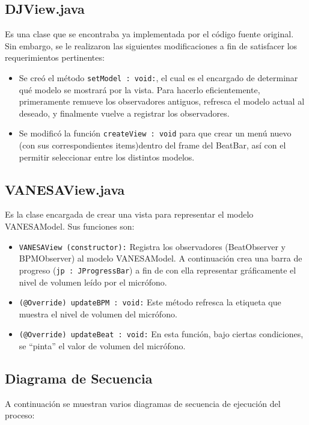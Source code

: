 \documentclass[10pt]{article} %
\newcommand{\comillas}[1]{``#1''}
\begin{document}
\subsection{DJView.java}
Es una clase que se encontraba ya implementada por el código fuente original. Sin embargo, se le realizaron las siguientes modificaciones a fin de satisfacer los requerimientos pertinentes:
\begin{itemize}
\item Se creó el método \verb+setModel : void:+, el cual es el encargado de determinar qué modelo se mostrará por la vista. Para hacerlo eficientemente, primeramente remueve los observadores antiguos, refresca el modelo actual al deseado, y finalmente vuelve a registrar los observadores.
\item Se modificó la función \verb+createView : void+ para que crear un menú nuevo (con sus correspondientes items)dentro del frame del BeatBar, así con el permitir seleccionar entre los distintos modelos.
\end{itemize}

\subsection{VANESAView.java}
Es la clase encargada de crear una vista para representar el modelo VANESAModel. Sus funciones son:
\begin{itemize}
\item \verb+VANESAView (constructor):+ Registra los observadores (BeatObserver y BPMObserver) al modelo VANESAModel. A continuación crea una barra de progreso (\verb+jp : JProgressBar+) a fin de con ella representar gráficamente el nivel de volumen leído por el micrófono.
\item \verb+(@Override) updateBPM : void:+ Este método refresca la etiqueta que muestra el nivel de volumen del micrófono.
\item \verb+(@Override) updateBeat : void:+ En esta función, bajo ciertas condiciones, se \comillas{pinta} el valor de volumen del micrófono.
\end{itemize}

\subsection{Diagrama de Secuencia}
A continuación se muestran varios diagramas de secuencia de ejecución del proceso:
\end{document}
